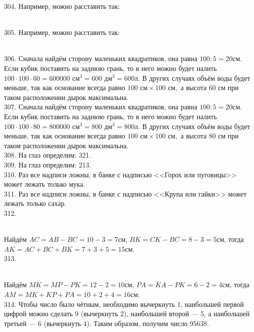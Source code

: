 304. Например, можно расставить так:
\begin{figure}[ht!]
\end{figure}\\
305. Например, можно расставить так:
\begin{figure}[ht!]
\end{figure}\\
306. Сначала найдём сторону маленьких квадратиков, она равна $100:5=20$см. Если кубик поставить на заднюю грань, то в него можно будет налить $100\cdot100\cdot60=600000\text{ см}^3=600\text{ дм}^3=600$л. В других случаях объём воды будет меньше, так как основание всегда равно $100\text{ см}\times100\text{ см},$ а высота 60 см при таком расположении дырок максимальна.\\
307. Сначала найдём сторону маленьких квадратиков, она равна $100:5=20$см. Если кубик поставить на заднюю грань, то в него можно будет налить $100\cdot100\cdot80=800000\text{ см}^3=800\text{ дм}^3=800$л. В других случаях объём воды будет меньше, так как основание всегда равно $100\text{ см}\times100\text{ см},$ а высота 80 см при таком расположении дырок максимальна.\\
308. На глаз определим: 321.\\
309. На глаз определим: 213.\\
310. Раз все надписи ложны, в банке с надписью <<Горох или пуговицы>> может лежать только мука.\\
311. Раз все надписи ложны, в банке с надписью <<Крупа или гайки>> может лежать только сахар.\\
312.\begin{figure}[ht!]
\end{figure}\\
Найдём $AC=AB-BC=10-3=7$см, $BK=CK-BC=8-3=5$см, тогда $AK=AC+BC+BK=7+3+5=15$см.\\
313. \begin{figure}[ht!]
\end{figure}\\
Найдём $MK=MP-PK=12-2=10$см, $PA=KA-PK=6-2=4$см, тогда $AM=MK+KP+PA=10+2+4=16$см.\\
314. Чтобы число было чётным, необходимо вычеркнуть 1, наибольшей первой цифрой можно сделать 9 (вычеркнуть 2), наибольшей второй --- 5, а наибольшей третьей --- 6 (вычеркнуть 4). Таким образом, получим число 95638.\\
